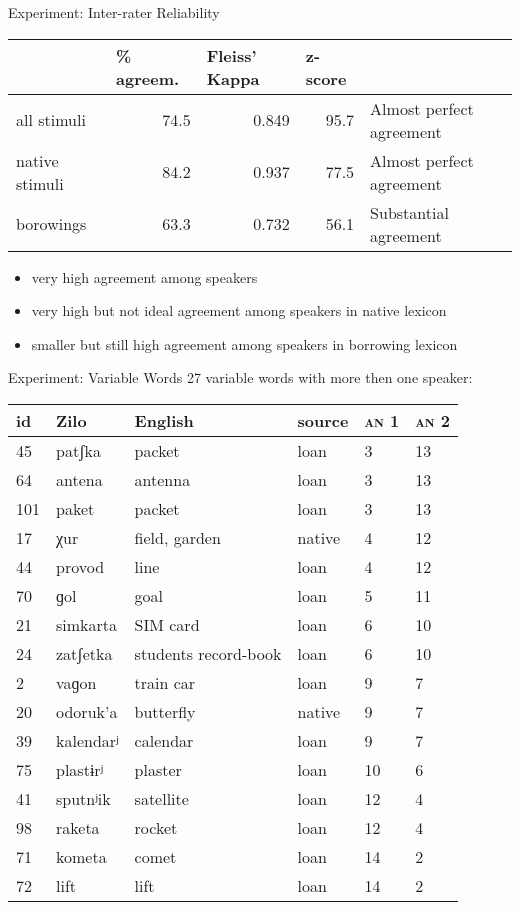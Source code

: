 \documentclass[13pt, t]{beamer}
\begin{document}
\begin{frame}{Experiment: Inter-rater Reliability}
\small
\begin{tabular}{|l|r|r|r|l|}
\hline
 & \multicolumn{1}{l|}{\% agreem.} & \multicolumn{1}{l|}{Fleiss' Kappa} & \multicolumn{1}{l|}{z-score} & \citep{fleiss71} \\ \hline
all stimuli & 74.5 & 0.849 & 95.7 & Almost perfect agreement\\ \hline
native stimuli & 84.2 & 0.937 & 77.5 & Almost perfect agreement \\ \hline
borowings & 63.3 & 0.732 & 56.1 & Substantial agreement \\ \hline
\end{tabular}
\normalsize
\vfill
\pause
\begin{itemize}
\item very high agreement among speakers
\item very high but not ideal agreement  among speakers in native lexicon
\item smaller but still high agreement  among speakers in borrowing lexicon
\end{itemize}
\end{frame}

\begin{frame}{Experiment: Variable Words}
27 variable words with more then one speaker: \bigskip\\

\small
\begin{tabular}{|l|l|l|l|l|l|}
\hline
id & Zilo & English & source & \textsc{an} 1 & \textsc{an} 2 \\ \hline
45 & patʃka & packet & loan & 3 & 13 \\ \hline
64 & antena & antenna & loan & 3 & 13 \\ \hline
101 & paket & packet & loan & 3 & 13 \\ \hline
17 & χur & field, garden & native & 4 & 12 \\ \hline
44 & provod & line & loan & 4 & 12 \\ \hline
70 & ɡol & goal & loan & 5 & 11 \\ \hline
21 & simkarta & SIM card& loan & 6 & 10 \\ \hline
24 & zatʃetka & students record-book & loan & 6 & 10 \\ \hline
2 & vaɡon & train car & loan & 9 & 7 \\ \hline
20 & odoruk'a & butterfly & native & 9 & 7 \\ \hline
39 & kalendarʲ & calendar & loan & 9 & 7 \\ \hline
75 & plastɨrʲ & plaster & loan & 10 & 6 \\ \hline
41 & sputnʲik & satellite & loan & 12 & 4 \\ \hline
98 & raketa & rocket & loan & 12 & 4 \\ \hline
71 & kometa & comet & loan & 14 & 2 \\ \hline
72 & lift & lift & loan & 14 & 2 \\ \hline
\end{tabular}
\end{frame}
\end{document}
